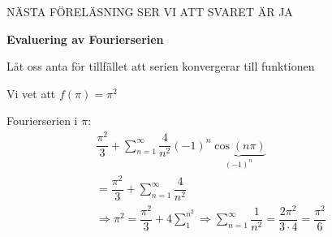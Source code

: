 \noindent NÄSTA FÖRELÄSNING SER VI ATT SVARET ÄR JA
\par\bigskip
\noindent\textbf{Evaluering av Fourierserien}\par
\noindent Låt oss anta för tillfället att serien konvergerar till funktionen\par
\noindent Vi vet att $f(\pi) = \pi^2$\par
\noindent Fourierserien i $\pi$:
\begin{equation*}
  \begin{gathered}
    \dfrac{\pi^2}{3}+\sum_{n=1}^{\infty}\dfrac{4}{n^2}(-1)^n\underbrace{\cos(n\pi)}_{\text{$(-1)^n$}}\\
    = \dfrac{\pi^2}{3}+\sum_{n=1}^{\infty}\dfrac{4}{n^2}\\
    \Rightarrow \pi^2 = \dfrac{\pi^2}{3}+4\sum_{1}^{n^2}\Rightarrow \sum_{n=1}^{\infty}\dfrac{1}{n^2} = \dfrac{2\pi^2}{3\cdot4} = \dfrac{\pi^2}{6}
  \end{gathered}
\end{equation*}
\par\bigskip
